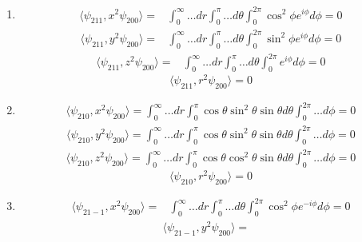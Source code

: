 \begin{enumerate}
\begin{enumerate}
    \item 
    \begin{align*}
        \langle\psi_{211},x^2\psi_{200}\rangle=&
        \int_0^\infty 
        \dots
        dr\int_0^\pi \dots d\theta 
        \int_0^{2\pi}
        \cos^2\phi 
        e^{i\phi} d\phi
        =0
    \end{align*}
    \begin{align*}
        \langle\psi_{211},y^2\psi_{200}\rangle=&
        \int_0^\infty 
        \dots
        dr\int_0^\pi \dots d\theta 
        \int_0^{2\pi}
        \sin^2\phi 
        e^{i\phi} d\phi
        =0
    \end{align*}
    \begin{align*}
        \langle\psi_{211},z^2\psi_{200}\rangle=&
        \int_0^\infty 
        \dots
        dr\int_0^\pi \dots d\theta 
        \int_0^{2\pi}
        e^{i\phi} d\phi
        =0
    \end{align*}
    $$
    \langle\psi_{211},r^2\psi_{200}\rangle=0
    $$
    \item 
    \begin{align*}
        \langle\psi_{210},x^2\psi_{200}\rangle=
        \int_0^\infty 
        \dots
        dr\int_0^\pi 
        \cos\theta \sin^2\theta \sin\theta 
        d\theta 
        \int_0^{2\pi}
        \dots d\phi=0
    \end{align*}
    \begin{align*}
        \langle\psi_{210},y^2\psi_{200}\rangle=
        \int_0^\infty 
        \dots
        dr\int_0^\pi 
        \cos\theta \sin^2\theta \sin\theta 
        d\theta 
        \int_0^{2\pi}
        \dots d\phi=0
    \end{align*}
    \begin{align*}
        \langle\psi_{210},z^2\psi_{200}\rangle=
        \int_0^\infty 
        \dots
        dr\int_0^\pi 
        \cos\theta \cos^2\theta \sin\theta 
        d\theta 
        \int_0^{2\pi}
        \dots d\phi=0
    \end{align*}
    $$
    \langle\psi_{210},r^2\psi_{200}\rangle=0
    $$
    \item 
    \begin{align*}
        \langle\psi_{21-1},x^2\psi_{200}\rangle=&
        \int_0^\infty 
        \dots
        dr\int_0^\pi \dots d\theta 
        \int_0^{2\pi}
        \cos^2\phi 
        e^{-i\phi} d\phi
        =0
    \end{align*}
    \begin{align*}
        \langle\psi_{21-1},y^2\psi_{200}\rangle=&

\end{align*}
\end{enumerate}
\end{enumerate}
